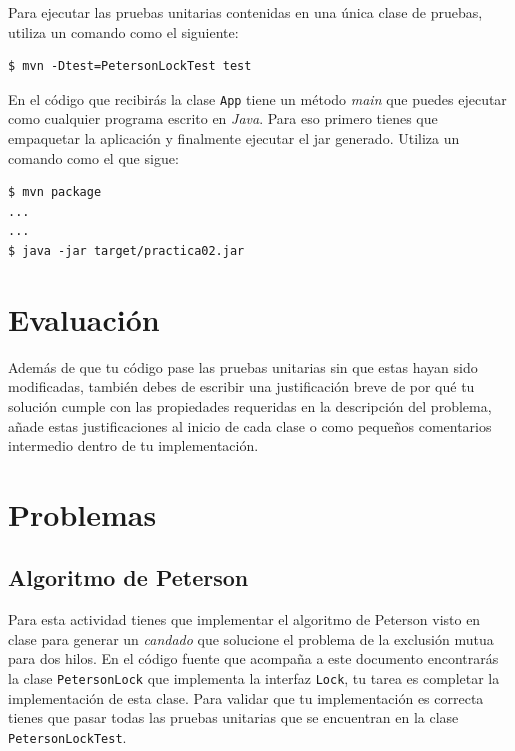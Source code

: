 \documentclass[a4paper,11pt]{article}
\begin{document}
	Para ejecutar las pruebas unitarias contenidas en una única clase de pruebas, utiliza un comando como el siguiente: \\
	
	\begin{tcolorbox}
		\begin{lstlisting}
$ mvn -Dtest=PetersonLockTest test
		\end{lstlisting}
	\end{tcolorbox}

	En el código que recibirás la clase \verb|App| tiene un método \emph{main} que puedes ejecutar como cualquier programa escrito en \emph{Java}. Para eso primero tienes que empaquetar la aplicación y finalmente ejecutar el jar generado. Utiliza un comando como el que sigue: \\
	
	\begin{tcolorbox}
		\begin{lstlisting}
$ mvn package
... 
...
$ java -jar target/practica02.jar
		\end{lstlisting}
	\end{tcolorbox}

	\section{Evaluación}
	Además de que tu código pase las pruebas unitarias sin que estas hayan sido modificadas, también debes de escribir una justificación breve de por qué tu solución cumple con las propiedades requeridas en la descripción del problema, añade estas justificaciones al inicio de cada clase o como pequeños comentarios intermedio dentro de tu implementación.
	
	\section{Problemas}

	\subsection{Algoritmo de Peterson}
	Para esta actividad tienes que implementar el algoritmo de Peterson visto en clase para generar un \emph{candado} que solucione el problema de la exclusión mutua para dos hilos. En el código fuente que acompaña a este documento encontrarás la clase \verb|PetersonLock| que implementa la interfaz \verb|Lock|, tu tarea es completar la implementación de esta clase. Para validar que tu implementación es correcta tienes que pasar todas las pruebas unitarias que se encuentran en la clase \verb|PetersonLockTest|.
	
\end{document}
